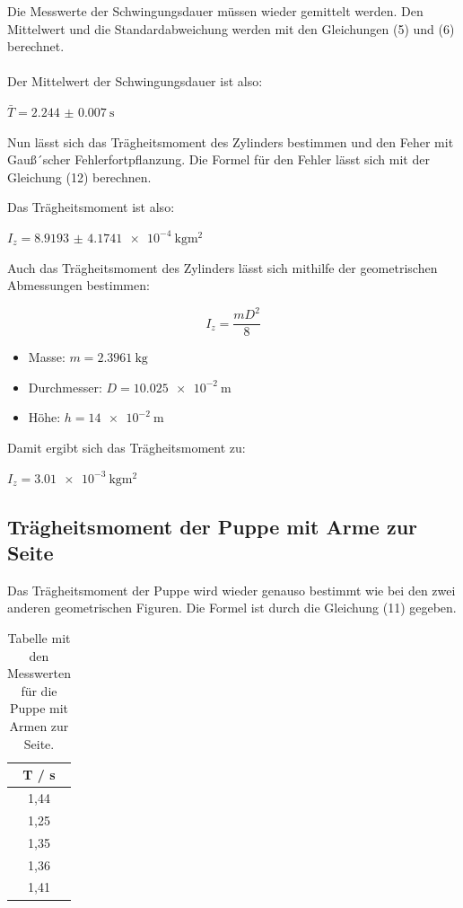 Die Messwerte der Schwingungsdauer müssen wieder gemittelt werden. Den Mittelwert
und die Standardabweichung werden mit den Gleichungen (5) und (6) berechnet. \\\\

Der Mittelwert der Schwingungsdauer ist also:

\centerline{$\bar{T} = \SI{2.244(7)}{\second}$}

Nun lässt sich das Trägheitsmoment des Zylinders bestimmen und den Feher mit Gauß´scher
Fehlerfortpflanzung. Die Formel für den Fehler lässt sich mit der Gleichung (12) berechnen.


Das Trägheitsmoment ist also:

\centerline{$I_z = \SI{8.9193(41741)e-4}{\kilo\gram\meter\squared}$}


Auch das Trägheitsmoment des Zylinders lässt sich mithilfe der geometrischen
Abmessungen bestimmen:

\begin{equation}
  I_z = \frac{mD^2}{8}
\end{equation}

\begin{itemize}
  \item Masse: $m = \SI{2.3961}{\kilo\gram}$
  \item Durchmesser: $D = \SI{10.025e-2}{\meter}$
  \item Höhe: $h = \SI{14e-2}{\meter}$
\end{itemize}

Damit ergibt sich das Trägheitsmoment zu:

\centerline{$I_z = \SI{3.01e-3}{\kilo\gram\meter\squared}$}

\subsection{Trägheitsmoment der Puppe mit Arme zur Seite}

Das Trägheitsmoment der Puppe wird wieder genauso bestimmt wie bei den zwei anderen
geometrischen Figuren. Die Formel ist durch die Gleichung (11) gegeben.


\begin{table}[H]
  \centering
  \caption{Tabelle mit den Messwerten für die Puppe mit Armen zur Seite.}
  \begin{tabular}{c}
    \toprule
    T / \si{\second} \\
    \midrule
    1,44 \\
    1,25 \\
    1,35 \\
    1,36 \\
    1,41 \\
    \bottomrule
  \end{tabular}
\end{table}

